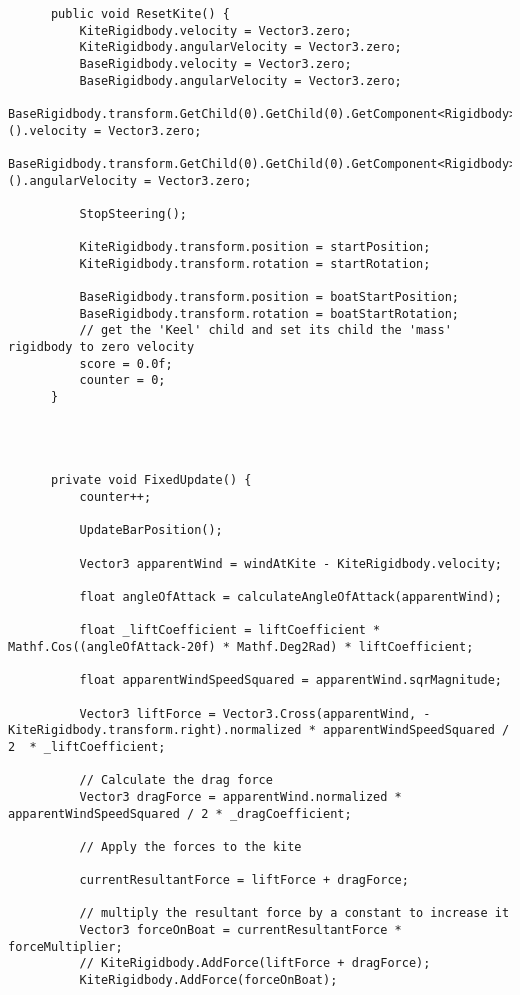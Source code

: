 \begin{lstlisting}
      public void ResetKite() {
          KiteRigidbody.velocity = Vector3.zero;
          KiteRigidbody.angularVelocity = Vector3.zero;
          BaseRigidbody.velocity = Vector3.zero;
          BaseRigidbody.angularVelocity = Vector3.zero;
          BaseRigidbody.transform.GetChild(0).GetChild(0).GetComponent<Rigidbody>().velocity = Vector3.zero;
          BaseRigidbody.transform.GetChild(0).GetChild(0).GetComponent<Rigidbody>().angularVelocity = Vector3.zero;
  
          StopSteering();
  
          KiteRigidbody.transform.position = startPosition;
          KiteRigidbody.transform.rotation = startRotation;
      
          BaseRigidbody.transform.position = boatStartPosition;
          BaseRigidbody.transform.rotation = boatStartRotation;
          // get the 'Keel' child and set its child the 'mass' rigidbody to zero velocity
          score = 0.0f;
          counter = 0;
      }
  
  
  
  
      private void FixedUpdate() {
          counter++;
  
          UpdateBarPosition();
  
          Vector3 apparentWind = windAtKite - KiteRigidbody.velocity;
  
          float angleOfAttack = calculateAngleOfAttack(apparentWind);
  
          float _liftCoefficient = liftCoefficient * Mathf.Cos((angleOfAttack-20f) * Mathf.Deg2Rad) * liftCoefficient;
  
          float apparentWindSpeedSquared = apparentWind.sqrMagnitude;
          
          Vector3 liftForce = Vector3.Cross(apparentWind, -KiteRigidbody.transform.right).normalized * apparentWindSpeedSquared / 2  * _liftCoefficient;
          
          // Calculate the drag force
          Vector3 dragForce = apparentWind.normalized * apparentWindSpeedSquared / 2 * _dragCoefficient;
  
          // Apply the forces to the kite
  
          currentResultantForce = liftForce + dragForce;
  
          // multiply the resultant force by a constant to increase it
          Vector3 forceOnBoat = currentResultantForce * forceMultiplier;
          // KiteRigidbody.AddForce(liftForce + dragForce);
          KiteRigidbody.AddForce(forceOnBoat);
  

\end{lstlisting}
